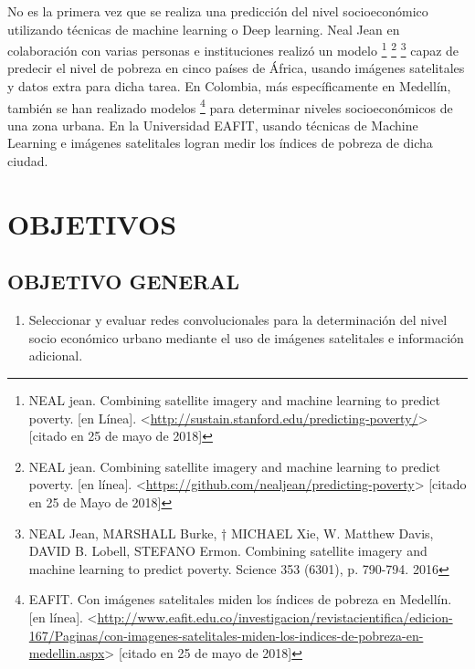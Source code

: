No es la primera vez que se realiza una predicción del nivel socioeconómico utilizando técnicas de machine learning o Deep learning. Neal Jean en colaboración con varias personas e instituciones realizó un modelo \footnote{NEAL jean. Combining satellite imagery and machine learning to predict poverty. [en Línea]. <\url{http://sustain.stanford.edu/predicting-poverty/}> [citado en 25 de mayo de 2018]} \footnote{NEAL jean. Combining satellite imagery and machine learning to predict poverty. [en línea]. <\url{https://github.com/nealjean/predicting-poverty}> [citado en 25 de Mayo de 2018]} \footnote{NEAL Jean, MARSHALL Burke, † MICHAEL Xie, W. Matthew Davis, DAVID B. Lobell, STEFANO Ermon. Combining satellite imagery and machine learning to predict poverty. Science 353 (6301), p. 790-794. 2016} capaz de predecir el nivel de pobreza en cinco países de África, usando imágenes satelitales y datos extra para dicha tarea. En Colombia, más específicamente en Medellín, también se han realizado modelos \footnote{EAFIT. Con imágenes satelitales miden los índices de pobreza en Medellín. [en línea]. <\url{http://www.eafit.edu.co/investigacion/revistacientifica/edicion-167/Paginas/con-imagenes-satelitales-miden-los-indices-de-pobreza-en-medellin.aspx}> [citado en 25 de mayo de 2018]} para determinar niveles socioeconómicos de una zona urbana. En la Universidad EAFIT, usando técnicas de Machine Learning e imágenes satelitales logran medir los índices de pobreza de dicha ciudad.
    
    
    
    
\newpage\chapter{OBJETIVOS} 

	\section{OBJETIVO GENERAL}
		\begin{enumerate}
		\item Seleccionar y evaluar redes convolucionales para la determinación del nivel socio económico urbano mediante el uso de imágenes satelitales e información adicional.
		\end{enumerate}

